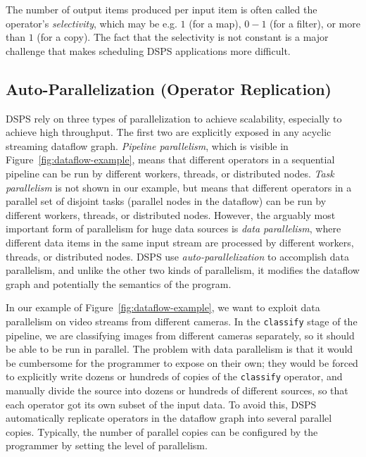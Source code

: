 The number of output items produced per input item is often called the operator's \emph{selectivity},
which may be e.g. $1$ (for a map), $0-1$ (for a filter), or more than $1$ (for a copy).
The fact that the selectivity is not constant is a major challenge that makes scheduling DSPS applications more difficult.

\subsection{Auto-Parallelization (Operator Replication)}

DSPS rely on three types of parallelization to achieve scalability, especially to achieve high throughput.
The first two are explicitly exposed in any acyclic streaming dataflow graph. \emph{Pipeline parallelism}, which is visible in Figure~\ref{fig:dataflow-example}, means that different operators in a sequential pipeline can be run by different workers, threads, or distributed nodes. \emph{Task parallelism} is not shown in our example, but means that different operators in a parallel set of disjoint tasks (parallel nodes in the dataflow) can be run by different workers, threads, or distributed nodes. However, the arguably most important form of parallelism for huge data sources is \emph{data parallelism}, where different data items in the same input stream are processed by different workers, threads, or distributed nodes.
DSPS use \emph{auto-parallelization} to accomplish data parallelism, and unlike the other two kinds of parallelism, it modifies the dataflow graph and potentially the semantics of the program.

In our example of Figure~\ref{fig:dataflow-example}, we want to exploit data parallelism on video streams from different cameras. In the \texttt{classify} stage of the pipeline, we are classifying images from different cameras separately, so it should be able to be run in parallel.
The problem with data parallelism is that it would be cumbersome for the programmer to expose on their own; they would be forced to explicitly write dozens or hundreds of copies of the \texttt{classify} operator, and manually divide the source into dozens or hundreds of different sources, so that each operator got its own subset of the input data.
To avoid this, DSPS automatically replicate operators in the dataflow graph into several parallel copies. Typically, the number of parallel copies can be configured by the programmer by setting the level of parallelism.

